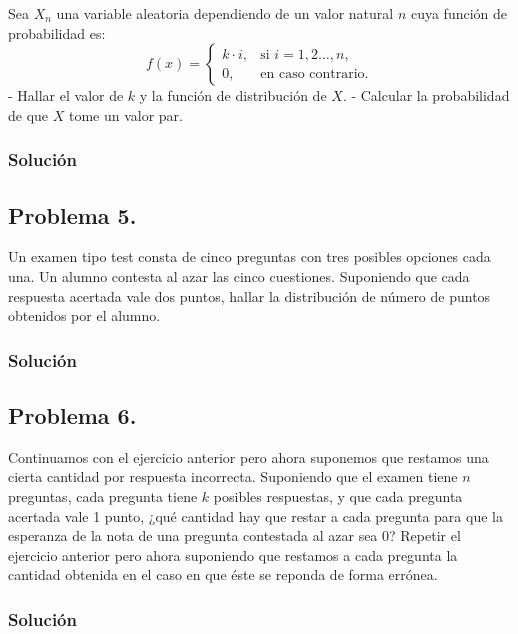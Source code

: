 \documentclass[
]{article}
\begin{document}
Sea \(X_n\) una variable aleatoria dependiendo de un valor natural \(n\)
cuya función de probabilidad es: \[
f(x)=\begin{cases}
k\cdot i, & \mbox{si }i=1,2\ldots,n, \\
0, & \mbox{en caso contrario.}
\end{cases}
\] - Hallar el valor de \(k\) y la función de distribución de \(X\). -
Calcular la probabilidad de que \(X\) tome un valor par.

\hypertarget{soluciuxf3n-3}{%
\subsubsection{Solución}\label{soluciuxf3n-3}}

\hypertarget{problema-5.}{%
\subsection{Problema 5.}\label{problema-5.}}

Un examen tipo test consta de cinco preguntas con tres posibles opciones
cada una. Un alumno contesta al azar las cinco cuestiones. Suponiendo
que cada respuesta acertada vale dos puntos, hallar la distribución de
número de puntos obtenidos por el alumno.

\hypertarget{soluciuxf3n-4}{%
\subsubsection{Solución}\label{soluciuxf3n-4}}

\hypertarget{problema-6.}{%
\subsection{Problema 6.}\label{problema-6.}}

Continuamos con el ejercicio anterior pero ahora suponemos que restamos
una cierta cantidad por respuesta incorrecta. Suponiendo que el examen
tiene \(n\) preguntas, cada pregunta tiene \(k\) posibles respuestas, y
que cada pregunta acertada vale 1 punto, ¿qué cantidad hay que restar a
cada pregunta para que la esperanza de la nota de una pregunta
contestada al azar sea 0? Repetir el ejercicio anterior pero ahora
suponiendo que restamos a cada pregunta la cantidad obtenida en el caso
en que éste se reponda de forma errónea.

\hypertarget{soluciuxf3n-5}{%
\subsubsection{Solución}\label{soluciuxf3n-5}}
\end{document}
